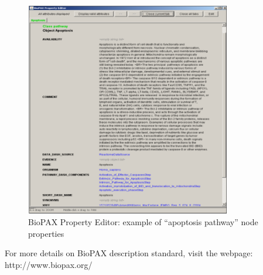 \begin{figure}[h]
\centering
\includegraphics[width=0.8\textwidth]{graphics/BioPAX_Property_Editor_apoptosis}
\caption{BioPAX Property Editor: example of “apoptosis pathway” node properties}
\label{BioPAX_Property_Editor_apoptosis}
\end{figure}	
For more details on BioPAX description standard, visit the webpage: http://www.biopax.org/ 
